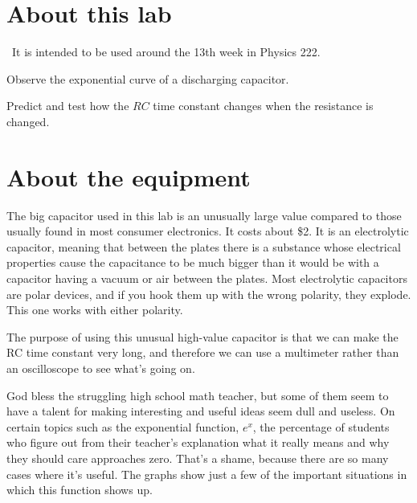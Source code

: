 \renewcommand\thechapter{c2.13}
\label{lab:rc-circuits}

\section*{About this lab}

\covid\ 
It is intended to be used around the 13th week in Physics 222.

\apparatus
{}

\begin{goals}

\item[] Observe the exponential curve of a discharging capacitor.

\item[] Predict and test how the $RC$ time constant changes when the resistance is changed.
\end{goals}

\section*{About the equipment}

The big capacitor used in this lab is an unusually large value compared to those usually found
in most consumer electronics. It costs about \$2. It is an electrolytic capacitor, meaning that
between the plates there is a substance whose electrical properties cause the capacitance to
be much bigger than it would be with a capacitor having a vacuum or air between the plates.
Most electrolytic capacitors are polar devices, and if you hook them up with the wrong polarity,
they explode. This one works with either polarity.

The purpose of using this unusual high-value capacitor is that we can make the RC time constant
very long, and therefore we can use a multimeter rather than an oscilloscope to see what's going
on.

\introduction

God bless the struggling high school math teacher, but some
of them seem to have a talent for making interesting and
useful ideas seem dull and useless. On certain topics such
as the exponential function, $e^x$, the percentage of students
who figure out from their teacher's explanation what it
really means and why they should care approaches zero.
That's a shame, because there are so many cases where it's
useful. The graphs show just a few of the important
situations in which this function shows up.

